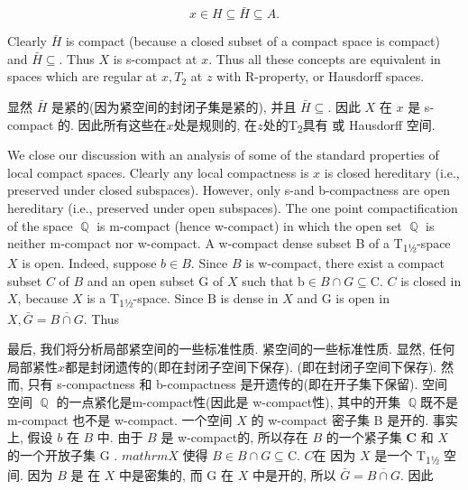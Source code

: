 \documentclass[options]{article}
\begin{document}
\[
		x \in H \subseteq \bar{H} \subseteq A .
\]
\begin{paracol}{2}
	\begin{en}
		Clearly $\bar{H}$ is compact (because a closed subset of a compact space is compact) and
		$\bar{H} \subseteq$. Thus $X$ is s-compact at $x$. Thus all these
		concepts are equivalent in spaces which are regular at $x, T_2$ at $z$ with
		R-property, or Hausdorff spaces.
	\end{en}
	\begin{cn}
		显然 $\bar{H}$ 是紧的(因为紧空间的封闭子集是紧的), 并且
		$\bar{H} \subseteq$. 因此 $X$ 在 $x$ 是 s-compact 的. 因此所有这些在$x$处是规则的, 在$z$处的T\textsubscript{\!$2$}具有
		或 Hausdorff 空间. \end{cn}

	\begin{en}
		We close our discussion with an analysis of some of the standard properties of local
		compact spaces. Clearly any local compactness is $x$ is closed hereditary
		(i.e., preserved under closed subspaces). However, only s-and b-compactness are open
		hereditary (i.e., preserved under open subspaces). The one point compactification of the
		space $\BbbQ$ is m-compact (hence w-compact) in which the open set
		$\BbbQ$ is neither m-compact nor w-compact. A w-compact dense
		subset B of a T\textsubscript{\!$1$½}-space $X$ is open.
		Indeed, suppose $b \in B$. Since $B$ is w-compact, there exist
		a compact subset $C$ of $B$ and an open subset $\mathrm{G}$ of
		$X$ such that $\mathrm{b} \in B \cap G \subseteq \mathrm{C}$. $C$ is closed in
		$X$, because $X$ is a T\textsubscript{\!$1$½}-space. Since $\mathrm{B}$ is
		dense in $X$ and $\mathrm{G}$ is open in $X, \bar{G}=\overline{B \cap
			G}$. Thus

	\end{en}
	\begin{cn}
		最后, 我们将分析局部紧空间的一些标准性质.
		紧空间的一些标准性质. 显然, 任何局部紧性$x$都是封闭遗传的(即在封闭子空间下保存).
		(即在封闭子空间下保存). 然而, 只有 s-compactness 和 b-compactness 是开遗传的(即在开子集下保留). 空间
		空间 $\BbbQ$ 的一点紧化是m-compact性(因此是 w-compact性), 其中的开集
		$\BbbQ$既不是 m-compact 也不是 w-compact. 一个空间 $X$ 的 w-compact 密子集 B 是开的.
		事实上, 假设 $b$ 在 $B$ 中. 由于 $B$ 是 w-compact的, 所以存在
		$B$ 的一个紧子集 $\mathbf{C}$ 和 $X$ 的一个开放子集 $\mathrm{G}$ .
		$mathrm{X}$ 使得 $B \in B \cap G \subseteq \mathrm{C}$. $C$在
		因为 $X$ 是一个 T\textsubscript{\!$1$½} 空间. 因为 $B$ 是
		在 $X$ 中是密集的, 而 $\mathrm{G}$ 在 $X$ 中是开的, 所以 $\bar{G}=\overline{B \cap
			G}$. 因此
	\end{cn}
\end{paracol}
\end{document}
